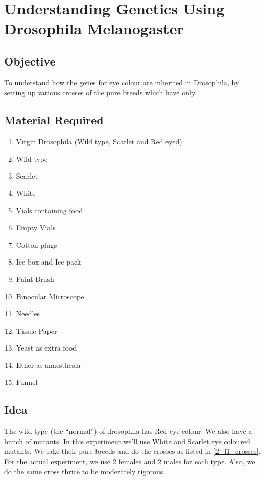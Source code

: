 \chapter{Understanding Genetics Using Drosophila Melanogaster}\label{exp2}
\section{Objective}
To understand how the genes for eye colour are inherited in Drosophila, by setting up various crosses of the pure breeds which have only.

\section{Material Required}
	\begin{enumerate}
		\item Virgin Drosophila (Wild type, Scarlet and Red eyed)
		\item Wild type
		\item Scarlet
		\item White
		\item Vials containing food
		\item Empty Vials
		\item Cotton plugs
		\item Ice box and Ice pack
		\item Paint Brush
		\item Binocular Microscope
		\item Needles
		\item Tissue Paper
		\item Yeast as extra food
		\item Ether as anaesthesia
		\item Funnel
	\end{enumerate}

\section{Idea}
	The wild type (the ``normal'') of drosophila has Red eye colour. We also have a bunch of mutants. In this experiment we'll use White and Scarlet eye coloured mutants. We take their pure breeds and do the crosses as listed in \autoref{2_f1_crosses}. For the actual experiment, we use 2 females and 2 males for each type. Also, we do the same cross thrice to be moderately rigorous.

